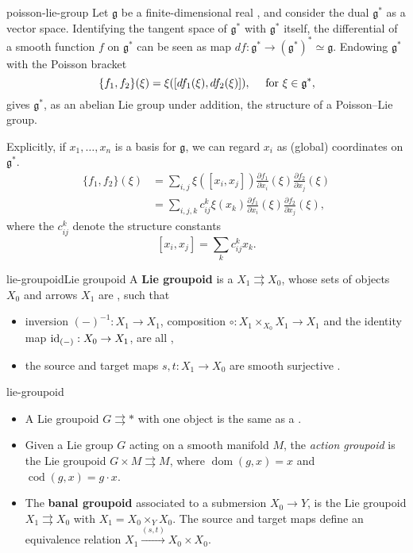 \begin{example}{poisson-lie-group}
    Let $\mathfrak{g}$ be a finite-dimensional real , and consider the dual $\mathfrak{g}^*$ as a vector space. Identifying the tangent space of $\mathfrak{g}^*$ with $\mathfrak{g}^*$ itself, the differential of a smooth function $f$ on $\mathfrak{g}^*$ can be seen as map $df : \mathfrak{g}^* \to (\mathfrak{g}^*)^* \simeq \mathfrak{g}$. Endowing $\mathfrak{g}^*$ with the Poisson bracket
    \[ \{ f_1, f_2 \}(\xi) = \xi([df_1(\xi), df_2(\xi)]), \quad \textup{ for } \xi \in \mathfrak{g}^* , \]
    gives $\mathfrak{g}^*$, as an abelian Lie group under addition, the structure of a Poisson--Lie group.
    
    Explicitly, if $x_1, \ldots, x_n$ is a basis for $\mathfrak{g}$, we can regard $x_i$ as (global) coordinates on $\mathfrak{g}^*$.
    \[ \begin{aligned}
        \{ f_1, f_2 \}(\xi)
            &= \sum_{i, j} \xi([ x_i, x_j]) \frac{\partial f_1}{\partial x_i}(\xi) \frac{\partial f_2}{\partial x_j} (\xi) \\
            &= \sum_{i, j, k} c_{ij}^k \xi(x_k) \frac{\partial f_1}{\partial x_i}(\xi) \frac{\partial f_2}{\partial x_j} (\xi) ,
    \end{aligned} \]
    where the $c_{ij}^k$ denote the structure constants
    \[ [x_i, x_j] = \sum_k c_{ij}^k x_k . \]
\end{example}

\begin{topic}{lie-groupoid}{Lie groupoid}
    A \textbf{Lie groupoid} is a  $X_1 \rightrightarrows X_0$, whose sets of objects $X_0$ and arrows $X_1$ are , such that
    \begin{itemize}
        \item inversion $(-)^{-1} : X_1 \to X_1$, composition $\circ : X_1 \times_{X_0} X_1 \to X_1$ and the identity map $\text{id}_{(-)} : X_0 \to X_1$, are all ,
        \item the source and target maps $s, t : X_1 \to X_0$ are smooth surjective .
    \end{itemize}
\end{topic}

\begin{example}{lie-groupoid}
    \begin{itemize}
        \item A Lie groupoid $G \rightrightarrows *$ with one object is the same as a .
        \item Given a Lie group $G$ acting on a smooth manifold $M$, the \textit{action groupoid} is the Lie groupoid $G \times M \rightrightarrows M$, where $\operatorname{dom}(g, x) = x$ and $\operatorname{cod}(g, x) = g \cdot x$.
        \item The \textbf{banal groupoid} associated to a submersion $X_0 \to Y$, is the Lie groupoid $X_1 \rightrightarrows X_0$ with $X_1 = X_0 \times_Y X_0$. The source and target maps define an equivalence relation $X_1 \xrightarrow{(s, t)} X_0 \times X_0$.
    \end{itemize}
\end{example}
